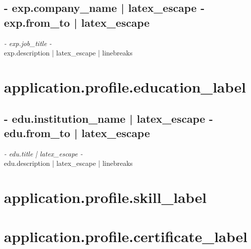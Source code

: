 \documentclass[a4paper, {{- application.profile.latex_pt -}}pt]{report}
\begin{document}
{{{{{{{{{{\subsection*{ {{- exp.company_name | latex_escape -}} \hfill {{ exp.from_to | latex_escape }}  }
\textit{ {{- exp.job_title -}} } \vspace{3mm} \\
{{ exp.description | latex_escape | linebreaks }}
{%
{%

{%
\section*{ {{ application.profile.education_label }}}
{%
\subsection*{ {{- edu.institution_name | latex_escape -}} \hfill {{ edu.from_to | latex_escape }} }
\textit{ {{- edu.title | latex_escape -}} } \vspace{3mm} \\
{{ edu.description | latex_escape | linebreaks }}
{%
{%

{%
\section*{ {{ application.profile.skill_label }}}
\begin{center}
\end{center}
{%

{%
\section*{ {{ application.profile.certificate_label }}}
{%

}}}}}}}}}}}}}}}}}}}}
\end{document}
